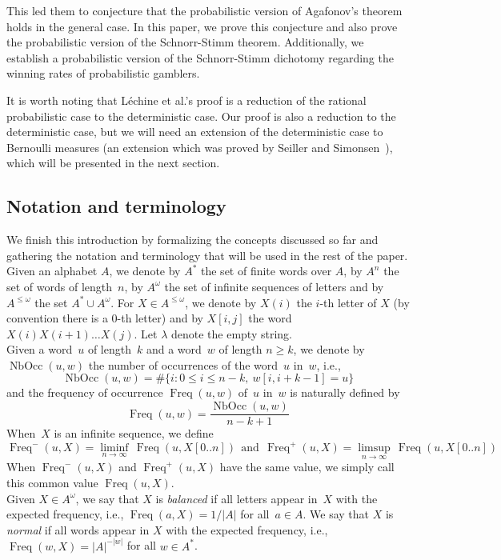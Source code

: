 \documentclass[11pt]{article}
\DeclareMathOperator{\nbocc}{NbOcc}
\DeclareMathOperator{\freq}{Freq}
\begin{document}
This led them to conjecture that the probabilistic version of Agafonov's theorem holds in the general case. In this paper, we prove this conjecture and also prove the probabilistic version of the Schnorr-Stimm theorem. Additionally, we establish a probabilistic version of the Schnorr-Stimm dichotomy regarding the winning rates of probabilistic gamblers.

It is worth noting that Léchine et al.'s proof is a reduction of the rational probabilistic case to the deterministic case. Our proof is also a reduction to the deterministic case, but we will need an extension of the deterministic case to Bernoulli measures (an extension which was proved by Seiller and Simonsen~\cite{SeillerS2020}), which will be presented in the next section. \\

\subsection*{Notation and terminology}


We finish this introduction by formalizing the concepts discussed so far and gathering the notation and terminology that will be used in the rest of the paper. \\


Given an alphabet $A$, we denote by $A^*$ the set of finite words over $A$, by $A^n$ the set of words of length~$n$, by $A^\omega$ the set of infinite sequences of letters and by $A^{\leq \omega}$ the set $A^* \cup A^\omega$. For $X \in A^{\leq \omega}$, we denote by $X(i)$ the $i$-th letter of $X$ (by convention there is a $0$-th letter) and by $X[i,j]$ the word $X(i)X(i+1)\ldots X(j)$. Let $\lambda$ denote the empty string.\\

Given a word~$u$ of length~$k$ and a word~$w$ of length $n \geq k$, we denote by $\nbocc(u,w)$ the number of occurrences of the word~$u$ in~$w$, i.e.,
\[
\nbocc(u,w) = \# \{i : 0 \leq i \leq n-k, \ w[i,i+k-1]=u\}
\]
and the frequency of occurrence $\freq(u,w)$ of~$u$ in~$w$ is naturally defined by 
\[
\freq(u,w) = \frac{\nbocc(u,w)}{n-k+1}
\]
When~$X$ is an infinite sequence, we define
\[
\freq^-(u,X) = \liminf_{n \rightarrow \infty}\, \freq(u,X[0..n]) ~ ~ \text{and} ~ ~ \freq^+(u,X) = \limsup_{n \rightarrow \infty}\,  \freq(u,X[0..n])
\]
When $\freq^-(u,X)$ and $\freq^+(u,X)$ have the same value, we simply call this common value $\freq(u,X)$. \\

Given $X \in A^\omega$, we say that $X$ is \emph{balanced} if all letters appear in~$X$ with the expected frequency, i.e., $\freq(a,X)=1/|A|$ for all~$a \in A$. We say that $X$ is \emph{normal} if all words appear in $X$ with the expected frequency, i.e., $\freq(w,X)=|A|^{-|w|}$ for all $w \in A^*$. \\
\end{document}
